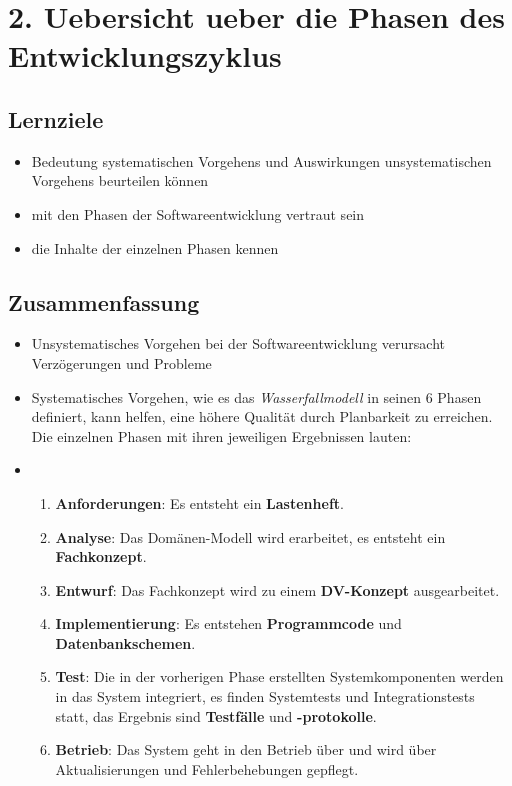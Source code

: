 \section*{2. Uebersicht ueber die Phasen des Entwicklungszyklus}
\subsection*{Lernziele}
\begin{itemize}
    \item Bedeutung systematischen Vorgehens und Auswirkungen unsystematischen Vorgehens beurteilen können
    \item mit den Phasen der Softwareentwicklung vertraut sein
    \item die Inhalte der einzelnen Phasen kennen
\end{itemize}

\subsection*{Zusammenfassung}
\begin{itemize}
    \item Unsystematisches Vorgehen bei der Softwareentwicklung verursacht Verzögerungen und Probleme
    \item Systematisches Vorgehen, wie es das \textit{Wasserfallmodell} in seinen 6 Phasen definiert, kann helfen, eine höhere Qualität
    durch Planbarkeit zu erreichen.\\
    Die einzelnen Phasen mit ihren jeweiligen Ergebnissen lauten:\\
    \item[]
    \begin{enumerate}
        \item \textbf{Anforderungen}: Es entsteht ein \textbf{Lastenheft}.
        \item \textbf{Analyse}: Das Domänen-Modell wird erarbeitet, es entsteht ein \textbf{Fachkonzept}.
        \item \textbf{Entwurf}: Das Fachkonzept wird zu einem \textbf{DV-Konzept} ausgearbeitet.
        \item \textbf{Implementierung}: Es entstehen \textbf{Programmcode} und \textbf{Datenbankschemen}.
        \item \textbf{Test}: Die in der vorherigen Phase erstellten Systemkomponenten werden in das System integriert, es finden Systemtests und Integrationstests statt, das Ergebnis sind \textbf{Testfälle} und \textbf{-protokolle}.
        \item \textbf{Betrieb}: Das System geht in den Betrieb über und wird über Aktualisierungen und Fehlerbehebungen gepflegt.
    \end{enumerate}
\end{itemize}

